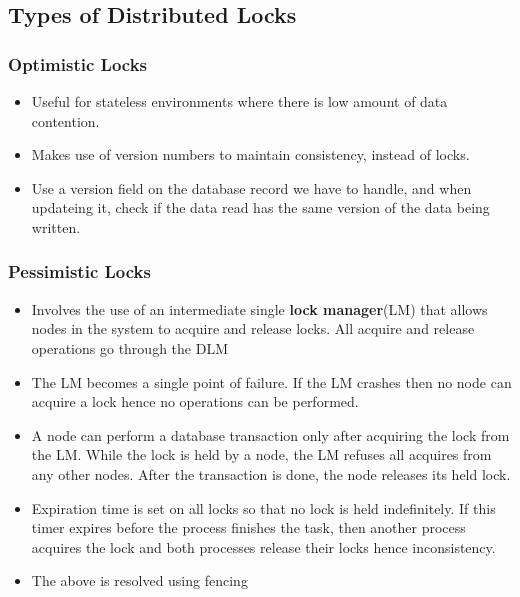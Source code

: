 \documentclass{article}
\begin{document}
\subsection{Types of Distributed Locks}
\subsubsection{Optimistic Locks}
\begin{itemize}
    \item Useful for stateless environments where there is low amount of data contention. 
    
    \item Makes use of version numbers to maintain consistency, instead of locks. 
    
    \item Use a version field on the database record we have to handle, and when updateing it, check if the data read has the same version of the data being written.
\end{itemize}

\subsubsection{Pessimistic Locks}
\begin{itemize}
    \item Involves the use of an intermediate single \textbf{lock manager}(LM) that allows nodes in the system to acquire and release locks. All acquire and release operations go through the DLM
    
    \item The LM becomes a single point of failure. If the LM crashes then no node can acquire a lock hence no operations can be performed. 
    
    \item A node can perform a database transaction only after acquiring the lock from the LM. While the lock is held by a node, the LM refuses all acquires from any other nodes. After the transaction is done, the node releases its held lock.
    
    \item Expiration time is set on all locks so that no lock is held indefinitely. If this timer expires before the process finishes the task, then another process acquires the lock and both processes release their locks hence inconsistency. 
    
    \item The above is resolved using fencing
\end{itemize}
\end{document}
